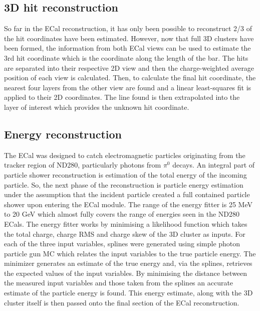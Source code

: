 \subsection{3D hit reconstruction}
\label{subsec:ECal3DHitReconstruction}
So far in the ECal reconstruction, it has only been possible to reconstruct 2/3 of the hit coordinates have been estimated.  However, now that full 3D clusters have been formed, the information from both ECal views can be used to estimate the 3rd hit coordinate which is the coordinate along the length of the bar.
\newline
The hits are separated into their respective 2D view and then the charge-weighted average position of each view is calculated.  Then, to calculate the final hit coordinate, the nearest four layers from the other view are found and a linear least-squares fit is applied to their 2D coordinates.  The line found is then extrapolated into the layer of interest which provides the unknown hit coordinate.

\subsection{Energy reconstruction}
\label{subsec:ECalEnergyReconstruction}
The ECal was designed to catch electromagnetic particles originating from the tracker region of ND280, particularly photons from $\pi^0$ decays.  An integral part of particle shower reconstruction is estimation of the total energy of the incoming particle.  So, the next phase of the reconstruction is particle energy estimation under the assumption that the incident particle created a full contained particle shower upon entering the ECal module.  The range of the energy fitter is 25 MeV to 20 GeV which almost fully covers the range of energies seen in the ND280 ECals.  The energy fitter works by minimising a likelihood function which takes the total charge, charge RMS and charge skew of the 3D cluster as inputs.  For each of the three input variables, splines were generated using simple photon particle gun MC which relates the input variables to the true particle energy.  The minimizer generates an estimate of the true energy and, via the splines, retrieves the expected values of the input variables.  By minimising the distance between the measured input variables and those taken from the splines an accurate estimate of the particle energy is found.  This energy estimate, along with the 3D cluster itself is then passed onto the final section of the ECal reconstruction.

